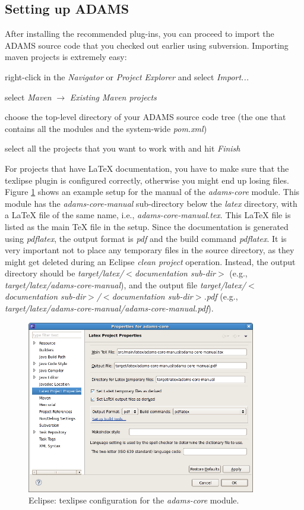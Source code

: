 \subsection{Setting up ADAMS}
After installing the recommended plug-ins, you can proceed to import the ADAMS
source code that you checked out earlier using subversion.
Importing maven projects is extremely easy:
\begin{tight_itemize}
  \item right-click in the \textit{Navigator} or \textit{Project Explorer} and
  select \textit{Import...}
  \item select \textit{Maven} $\rightarrow$ \textit{Existing Maven projects}
  \item choose the top-level directory of your ADAMS source code tree (the one
  that contains all the modules and the system-wide \textit{pom.xml})
  \item select all the projects that you want to work with and hit
  \textit{Finish}
\end{tight_itemize}
For projects that have LaTeX documentation, you have to make sure that the
texlipse plugin is configured correctly, otherwise you might end up losing
files. Figure \ref{eclipse-texlipse_preferences} shows an example setup for the
manual of the \textit{adams-core} module. This module has the
\textit{adams-core-manual} sub-directory below the \textit{latex} directory,
with a LaTeX file of the same name, i.e., \textit{adams-core-manual.tex}. This
LaTeX file is listed as the main TeX file in the setup. Since the documentation
is generated using \textit{pdflatex}, the output format is \textit{pdf} and the
build command \textit{pdflatex}. It is very important not to place any temporary
files in the source directory, as they might get deleted during an Eclipse
\textit{clean project} operation. Instead, the output directory should be
\textit{target/latex/$<$documentation sub-dir$>$} (e.g.,
\textit{target/latex/adams-core-manual}), and the output file
\textit{target/latex/$<$documentation sub-dir$>$/$<$documentation
sub-dir$>$.pdf} (e.g., \textit{target/latex/adams-core-manual/adams-core-manual.pdf}).

\begin{figure}[htb]
  \centering
  \includegraphics[width=10.0cm]{images/eclipse-texlipse_preferences.png}
  \caption{Eclipse: texlipse configuration for the \textit{adams-core} module.}
  \label{eclipse-texlipse_preferences}
\end{figure}

